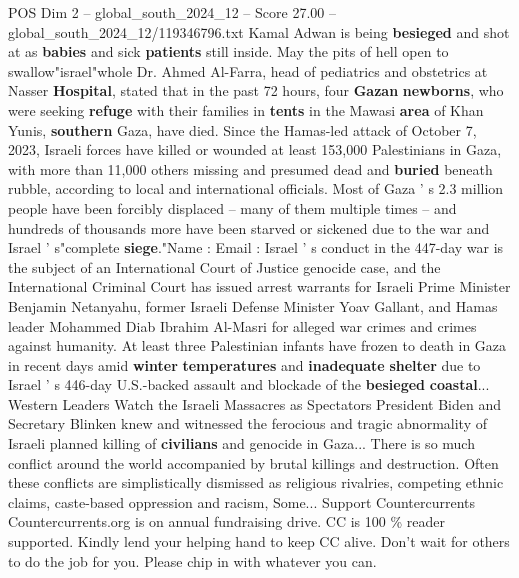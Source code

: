 \begin{textsample}{POS Dim 2 – global\_south\_2024\_12 – Score 27.00 – global\_south\_2024\_12/119346796.txt}
Kamal Adwan is being \textbf{besieged} and shot at as \textbf{babies} and sick \textbf{patients} still inside.
May the pits of hell open to swallow"israel"whole Dr.
Ahmed Al-Farra, head of pediatrics and obstetrics at Nasser \textbf{Hospital}, stated that in the past 72 hours, four \textbf{Gazan} \textbf{newborns}, who were seeking \textbf{refuge} with their families in \textbf{tents} in the Mawasi \textbf{area} of Khan Yunis, \textbf{southern} Gaza, have died.
Since the Hamas-led attack of October 7, 2023, Israeli forces have killed or wounded at least 153,000 Palestinians in Gaza, with more than 11,000 others missing and presumed dead and \textbf{buried} beneath rubble, according to local and international officials.
Most of Gaza ' s 2.3 million people have been forcibly displaced -- many of them multiple times -- and hundreds of thousands more have been starved or sickened due to the war and Israel ' s"complete \textbf{siege}."Name : Email : Israel ' s conduct in the 447-day war is the subject of an International Court of Justice genocide case, and the International Criminal Court has issued arrest warrants for Israeli Prime Minister Benjamin Netanyahu, former Israeli Defense Minister Yoav Gallant, and Hamas leader Mohammed Diab Ibrahim Al-Masri for alleged war crimes and crimes against humanity.
At least three Palestinian infants have frozen to death in Gaza in recent days amid \textbf{winter} \textbf{temperatures} and \textbf{inadequate} \textbf{shelter} due to Israel ' s 446-day U.S.-backed assault and blockade of the \textbf{besieged} \textbf{coastal}...
Western Leaders Watch the Israeli Massacres as Spectators President Biden and Secretary Blinken knew and witnessed the ferocious and tragic abnormality of Israeli planned killing of \textbf{civilians} and genocide in Gaza...
There is so much conflict around the world accompanied by brutal killings and destruction.
Often these conflicts are simplistically dismissed as religious rivalries, competing ethnic claims, caste-based oppression and racism, Some...
Support Countercurrents Countercurrents.org is on annual fundraising drive.
CC is 100 \% reader supported.
Kindly lend your helping hand to keep CC alive.
Don't wait for others to do the job for you.
Please chip in with whatever you can.

\end{textsample}
